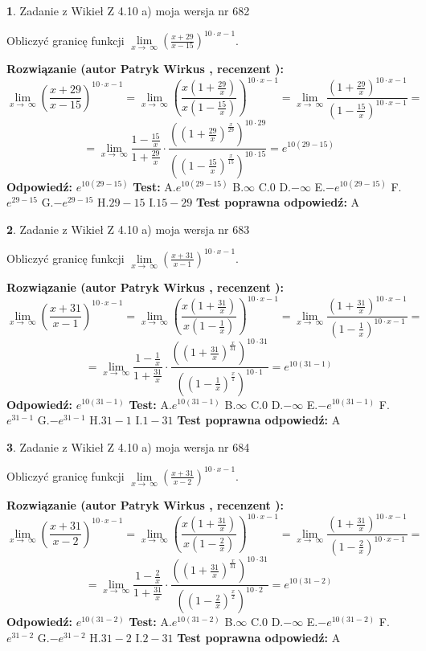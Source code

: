 \documentclass[12pt, a4paper]{article}
\theoremstyle{definition} %
\newtheorem{zad}{}
\newcommand{\zadStart}[1]{\begin{zad}#1\newline}
\newcommand{\zadStop}{\end{zad}}
\newcommand{\rozwStart}[2]{\noindent \textbf{Rozwiązanie (autor #1 , recenzent #2): }\newline}
\newcommand{\rozwStop}{\newline}
\newcommand{\odpStart}{\noindent \textbf{Odpowiedź:}\newline}
\newcommand{\odpStop}{\newline}
\newcommand{\testStart}{\noindent \textbf{Test:}\newline}
\newcommand{\testStop}{\newline}
\newcommand{\kluczStart}{\noindent \textbf{Test poprawna odpowiedź:}\newline}
\newcommand{\kluczStop}{\newline}
\begin{document}
\zadStart{Zadanie z Wikieł Z 4.10 a) moja wersja nr 682}


Obliczyć granicę funkcji  $\lim\limits_{x\to\ \infty}(\frac{x+29}{x-15})^{10\cdot x-1}$.
\zadStop
\rozwStart{Patryk Wirkus}{}
$$\lim\limits_{x\to\ \infty}(\frac{x+29}{x-15})^{10\cdot x-1} = \lim\limits_{x\to\ \infty}(\frac{x(1+\frac{29}{x})}{x(1-\frac{15}{x})})^{10\cdot x-1}=\lim\limits_{x\to\ \infty}\frac{(1+\frac{29}{x})^{10\cdot x-1}}{(1-\frac{15}{x})^{10\cdot x-1}}=$$
$$=\lim\limits_{x\to\ \infty}\frac{1-\frac{15}{x}}{1+\frac{29}{x}}\cdot\frac{((1+\frac{29}{x})^{\frac{x}{29}})^{10\cdot29}}{((1-\frac{15}{x})^{\frac{x}{15}})^{10\cdot15}}=e^{10(29-15)}$$
\rozwStop
\odpStart
$e^{10(29-15)}$
\odpStop
\testStart
A.$e^{10(29-15)}$ B.$\infty$ C.$0$ D.$-\infty$ E.$-e^{10(29-15)}$
F.$e^{29-15}$ G.$-e^{29-15}$
H.$29-15$
I.$15-29$
\testStop
\kluczStart
A
\kluczStop



\zadStart{Zadanie z Wikieł Z 4.10 a) moja wersja nr 683}


Obliczyć granicę funkcji  $\lim\limits_{x\to\ \infty}(\frac{x+31}{x-1})^{10\cdot x-1}$.
\zadStop
\rozwStart{Patryk Wirkus}{}
$$\lim\limits_{x\to\ \infty}(\frac{x+31}{x-1})^{10\cdot x-1} = \lim\limits_{x\to\ \infty}(\frac{x(1+\frac{31}{x})}{x(1-\frac{1}{x})})^{10\cdot x-1}=\lim\limits_{x\to\ \infty}\frac{(1+\frac{31}{x})^{10\cdot x-1}}{(1-\frac{1}{x})^{10\cdot x-1}}=$$
$$=\lim\limits_{x\to\ \infty}\frac{1-\frac{1}{x}}{1+\frac{31}{x}}\cdot\frac{((1+\frac{31}{x})^{\frac{x}{31}})^{10\cdot31}}{((1-\frac{1}{x})^{\frac{x}{1}})^{10\cdot1}}=e^{10(31-1)}$$
\rozwStop
\odpStart
$e^{10(31-1)}$
\odpStop
\testStart
A.$e^{10(31-1)}$ B.$\infty$ C.$0$ D.$-\infty$ E.$-e^{10(31-1)}$
F.$e^{31-1}$ G.$-e^{31-1}$
H.$31-1$
I.$1-31$
\testStop
\kluczStart
A
\kluczStop



\zadStart{Zadanie z Wikieł Z 4.10 a) moja wersja nr 684}


Obliczyć granicę funkcji  $\lim\limits_{x\to\ \infty}(\frac{x+31}{x-2})^{10\cdot x-1}$.
\zadStop
\rozwStart{Patryk Wirkus}{}
$$\lim\limits_{x\to\ \infty}(\frac{x+31}{x-2})^{10\cdot x-1} = \lim\limits_{x\to\ \infty}(\frac{x(1+\frac{31}{x})}{x(1-\frac{2}{x})})^{10\cdot x-1}=\lim\limits_{x\to\ \infty}\frac{(1+\frac{31}{x})^{10\cdot x-1}}{(1-\frac{2}{x})^{10\cdot x-1}}=$$
$$=\lim\limits_{x\to\ \infty}\frac{1-\frac{2}{x}}{1+\frac{31}{x}}\cdot\frac{((1+\frac{31}{x})^{\frac{x}{31}})^{10\cdot31}}{((1-\frac{2}{x})^{\frac{x}{2}})^{10\cdot2}}=e^{10(31-2)}$$
\rozwStop
\odpStart
$e^{10(31-2)}$
\odpStop
\testStart
A.$e^{10(31-2)}$ B.$\infty$ C.$0$ D.$-\infty$ E.$-e^{10(31-2)}$
F.$e^{31-2}$ G.$-e^{31-2}$
H.$31-2$
I.$2-31$
\testStop
\kluczStart
A
\kluczStop
\end{document}

